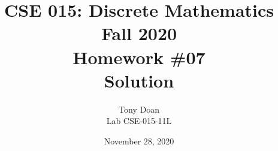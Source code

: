 \documentclass[11pt]{article}
\begin{document}
\author{Tony Doan\\
Lab CSE-015-11L }

\title{CSE 015: Discrete Mathematics\\
Fall 2020\\
Homework \#07\\
Solution}

\date{November 28, 2020}
\maketitle

\end{document}
